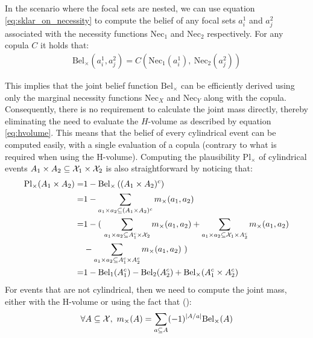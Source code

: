 In the scenario where the focal sets are nested, we can use equation \eqref{eq:sklar_on_necessity} to compute the belief of any focal sets $a^1_i$ and $a^2_j$ associated with the necessity functions $\mathrm{Nec}_1$ and $\mathrm{Nec}_2$ respectively. For any copula $C$ it holds that:
\begin{align*}
    \mathrm{Bel}_\times(a^1_i, a^2_j) = C(\mathrm{Nec}_1(a^1_i),~\mathrm{Nec}_2(a^2_j))
\end{align*}

This implies that the joint belief function $\mathrm{Bel}_\times$ can be efficiently derived using only the marginal necessity functions $\mathrm{Nec}_X$ and $\mathrm{Nec}_Y$ along with the copula. Consequently, there is no requirement to calculate the joint mass directly, thereby eliminating the need to evaluate the $H$-volume as described by equation \eqref{eq:hvolume}. This means that the belief of every cylindrical event can be computed easily, with a single evaluation of a copula (contrary to what is required when using the H-volume). Computing the plausibility $\mathrm{Pl}_\times$ of cylindrical events $A_1\times A_2\subseteq{\mathcal{X}}_1\times{\mathcal{X}}_2$ is also straightforward by noticing that:
\begin{align*}
    \mathrm{Pl}_\times(A_1\times A_2) =& 1-\mathrm{Bel}_\times\left((A_1\times A_2)^c\right)\\
    =& 1 - \sum_{a_1\times a_2\subseteq(A_1\times A_2)^c}m_\times(a_1,a_2)\\
    =& 1 - (~\sum_{a_1\times a_2\subseteq A_1^c\times {\mathcal{X}}_2}m_\times(a_1,a_2) + \sum_{a_1\times a_2\subseteq {\mathcal{X}}_1\times A_2^c}m_\times(a_1,a_2) \\
    &- \sum_{a_1\times a_2\subseteq A_1^c\times A_2^c}m_\times(a_1,a_2) ~)\\
    =& 1 - \mathrm{Bel}_1(A_1^c) - \mathrm{Bel}_2(A_2^c) + \mathrm{Bel}_\times(A_1^c\times A_2^c)
\end{align*}
For events that are not cylindrical, then we need to compute the joint mass, either with the H-volume or using the fact that (\cite{shafer_mathematical_1976}):
\begin{align}
    \forall A\subseteq{\mathcal{X}},~m_\times(A)=\sum_{a\subseteq A}(-1)^{|A/a|}\mathrm{Bel}_\times(A)\label{eq:bel_to_mass}
\end{align}

